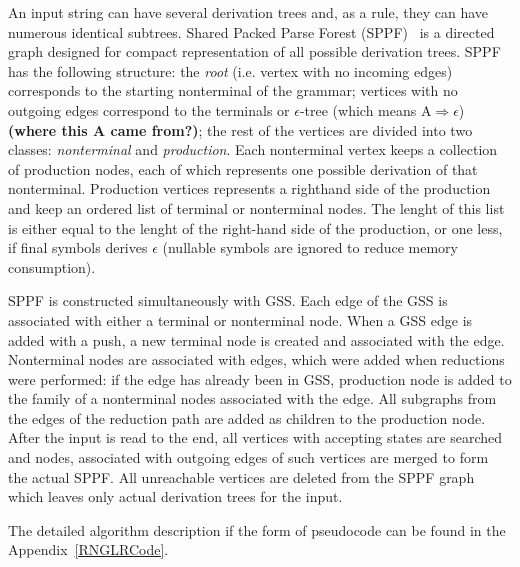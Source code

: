 An input string can have several derivation trees and, as a rule, they can have 
numerous identical subtrees. Shared Packed Parse Forest (SPPF)~\cite{SPPF} is a directed graph
designed for compact representation of all possible derivation trees.  
SPPF has the following structure: the \emph{root} (i.e. vertex with no incoming edges) corresponds 
to the starting nonterminal of the grammar; vertices with no outgoing edges correspond to the terminals 
or $\epsilon$-tree (which means $\mathrm{A} \Rightarrow \epsilon$) {\bf (where this A came from?)}; 
the rest of the vertices are divided into two classes: \emph{nonterminal} and \emph{production}. 
Each nonterminal vertex keeps a collection of production nodes, each of which represents one  
possible derivation of that nonterminal. Production vertices represents a righthand side of the 
production and keep an ordered list of terminal or nonterminal nodes. The lenght of this list is 
either equal to the lenght of the right-hand side of the production, or one less, if final 
symbols derives $\epsilon$ (nullable symbols are ignored to reduce memory consumption). 

SPPF is constructed simultaneously with GSS. Each edge of the GSS is associated with either 
a terminal or nonterminal node. When a GSS edge is added with a push, 
a new terminal node is created and associated with the edge. Nonterminal nodes are associated
with edges, which were added when reductions were performed: if the edge has already been in GSS, 
production node is added to the family of a nonterminal nodes associated with the edge. All subgraphs 
from the edges of the reduction path are added as children to the production node. After the input 
is read to the end, all vertices with accepting states are searched and nodes, associated with 
outgoing edges of such vertices are merged to form the actual SPPF. All unreachable vertices 
are deleted from the SPPF graph which leaves only actual derivation trees for the input.

The detailed algorithm description if the form of pseudocode can be found in the 
Appendix~\ref{RNGLRCode}. 

